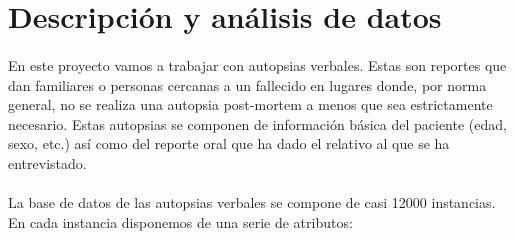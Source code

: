 \documentclass[10pt,a4paper]{article}
\begin{document}
\section{Descripción y análisis de datos}
	\paragraph{}
	En este proyecto vamos a trabajar con autopsias verbales. Estas son reportes que dan familiares o personas cercanas a un fallecido en lugares donde, por norma general, no se realiza una autopsia post-mortem a menos que sea estrictamente necesario. Estas autopsias se componen de información básica del paciente (edad, sexo, etc.) así como del reporte oral que ha dado el relativo al que se ha entrevistado.
	\paragraph{}
	La base de datos de las autopsias verbales se compone de casi 12000 instancias. En cada instancia disponemos de una serie de atributos:
\end{document}
